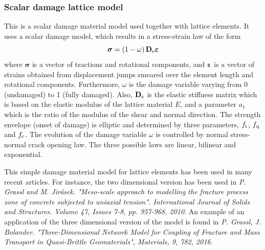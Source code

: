 \documentclass[a4paper]{article}
\begin{document}
\subsubsection{Scalar damage lattice model}
This is a scalar damage material model used together with lattice elements.
It uses a scalar damage model, which results in a stress-strain law of the form
\begin{equation}
\boldsymbol{\sigma} = \left(1-\omega\right) \mathbf{D}_{\rm e} \boldsymbol{\varepsilon}
\end{equation}
where $\boldsymbol{\sigma}$ is a vector of tractions and rotational components, and $\boldsymbol{\varepsilon}$ is a vector of strains obtained from displacement jumps smeared over the element length and rotational components.
Furthermore, $\omega$ is the damage variable varying from 0 (undamaged) to 1 (fully damaged). 
Also, $\mathbf{D}_{\rm e}$ is the elastic stiffness matrix which is based on the elastic modulus of the lattice material $E$, and a parameter $a_1$ which is the ratio of the modulus of the shear and normal direction.
The strength envelope (onset of damage) is elliptic and determined by three  parameters, $f_{\rm t}$, $f_{\rm q}$ and $f_{\rm c}$. The evolution of the damage variable $\omega$ is controlled by normal stress-normal crack opening law. The three possible laws are linear, bilinear and exponential.

This simple damage material model for lattice elements has been used in many recent articles. For instance, the two dimensional version has been used in \textit{P. Grassl and M. Jir\'{a}sek. "Meso-scale approach to modelling the fracture process zone of concrete subjected to uniaxial tension". International Journal of Solids and Structures. Volume 47, Issues 7-8, pp. 957-968, 2010}. An example of an application of the three dimensional version of the model is found in \textit{P. Grassl, J. Bolander. "Three-Dimensional Network Model for Coupling of Fracture and Mass Transport in Quasi-Brittle Geomaterials", Materials, 9, 782, 2016}.  
\end{document}
